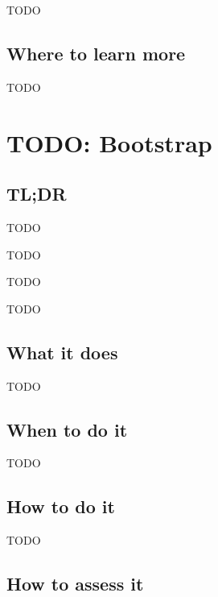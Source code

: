 \documentclass[
]{book}
\providecommand{\tightlist}{%
  \setlength{\itemsep}{0pt}\setlength{\parskip}{0pt}}
\begin{document}
TODO

\hypertarget{where-to-learn-more-8}{%
\section{Where to learn more}\label{where-to-learn-more-8}}

TODO

\hypertarget{bootstrap}{%
\chapter{TODO: Bootstrap}\label{bootstrap}}

\hypertarget{tldr-9}{%
\section{TL;DR}\label{tldr-9}}

\begin{description}
\tightlist
\item[What it does]
TODO
\item[When to do it]
TODO
\item[How to do it]
TODO
\item[How to assess it]
TODO
\end{description}

\hypertarget{what-it-does-9}{%
\section{What it does}\label{what-it-does-9}}

TODO

\hypertarget{when-to-do-it-9}{%
\section{When to do it}\label{when-to-do-it-9}}

TODO

\hypertarget{how-to-do-it-9}{%
\section{How to do it}\label{how-to-do-it-9}}

TODO

\hypertarget{how-to-assess-it-9}{%
\section{How to assess it}\label{how-to-assess-it-9}}
\end{document}
